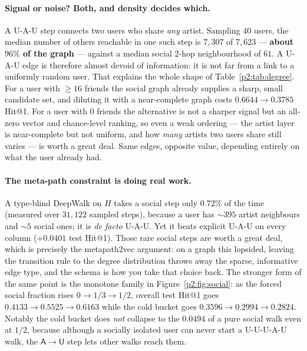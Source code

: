 \paragraph{Signal or noise? Both, and density decides which.}
A \textsf{U-A-U} step connects two users who share \emph{any} artist.  Sampling $40$
users, the median number of others reachable in one such step is $7{,}307$ of $7{,}623$
--- \textbf{about $96\%$ of the graph} --- against a median social $2$-hop neighbourhood
of $61$.  A U-A-U edge is therefore almost devoid of information: it is not far from a
link to a uniformly random user.  That explains the whole shape of
Table~\ref{p2:tab:degree}.  For a user with $\ge16$ friends the social graph already
supplies a sharp, small candidate set, and diluting it with a near-complete graph costs
$0.6644 \to 0.3785$ Hit@1.  For a user with $0$ friends the alternative is not a sharper
signal but an all-zero vector and chance-level ranking, so even a weak ordering --- the
artist layer is near-complete but not uniform, and how \emph{many} artists two users
share still varies --- is worth a great deal.  Same edges, opposite value, depending
entirely on what the user already had.

\paragraph{The meta-path constraint is doing real work.}
A type-blind DeepWalk on $H$ takes a social step only $0.72\%$ of the time (measured over
$31{,}122$ sampled steps), because a user has $\sim\!395$ artist neighbours and $\sim\!5$
social ones; it is \emph{de facto} \textsf{U-A-U}.  Yet it beats explicit \textsf{U-A-U}
on every column ($+0.0401$ test Hit@1).  Those rare social steps are worth a great deal,
which is precisely the metapath2vec argument: on a graph this lopsided, leaving the
transition rule to the degree distribution throws away the sparse, informative edge type,
and the schema is how you take that choice back.  The stronger form of the same point is
the monotone family in Figure~\ref{p2:fig:social}: as the forced social fraction rises
$0 \to 1/3 \to 1/2$, overall test Hit@1 goes $0.4133 \to 0.5525 \to 0.6163$ while the cold
bucket goes $0.3596 \to 0.2994 \to 0.2824$.  Notably the cold bucket does \emph{not}
collapse to the $0.0494$ of a pure social walk even at $1/2$, because although a socially
isolated user can never start a \textsf{U-U-U-A-U} walk, the $\mathsf{A}\to\mathsf{U}$
step lets other walks reach them.

